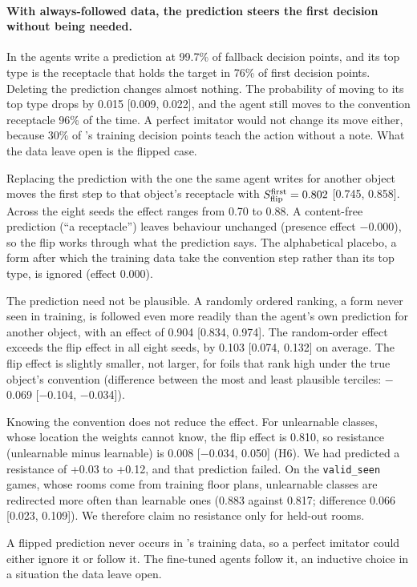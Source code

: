 \paragraph{With always-followed data, the prediction steers the first decision without being needed.}
In  the agents write a prediction at 99.7\% of fallback decision points, and its top type is the receptacle that holds the target in 76\% of first decision points. Deleting the prediction changes almost nothing. The probability of moving to its top type drops by 0.015 [0.009, 0.022], and the agent still moves to the convention receptacle 96\% of the time. A perfect imitator would not change its move either, because 30\% of 's training decision points teach the action without a note. What the data leave open is the flipped case.

Replacing the prediction with the one the same agent writes for another object moves the first step to that object's receptacle with $S_{\mathrm{flip}}^{\mathrm{first}} = 0.802$ [0.745, 0.858]. Across the eight seeds the effect ranges from 0.70 to 0.88. A content-free prediction (``a receptacle'') leaves behaviour unchanged (presence effect $-$0.000), so the flip works through what the prediction says. The alphabetical placebo, a form after which the training data take the convention step rather than its top type, is ignored (effect 0.000).

The prediction need not be plausible. A randomly ordered ranking, a form never seen in training, is followed even more readily than the agent's own prediction for another object, with an effect of 0.904 [0.834, 0.974]. The random-order effect exceeds the flip effect in all eight seeds, by 0.103 [0.074, 0.132] on average. The flip effect is slightly smaller, not larger, for foils that rank high under the true object's convention (difference between the most and least plausible terciles: $-$0.069 [$-$0.104, $-$0.034]).

Knowing the convention does not reduce the effect. For unlearnable classes, whose location the weights cannot know, the flip effect is 0.810, so resistance (unlearnable minus learnable) is 0.008 [$-$0.034, 0.050] (H6). We had predicted a resistance of +0.03 to +0.12, and that prediction failed. On the \texttt{valid\_seen} games, whose rooms come from training floor plans, unlearnable classes are redirected more often than learnable ones (0.883 against 0.817; difference 0.066 [0.023, 0.109]). We therefore claim no resistance only for held-out rooms.

A flipped prediction never occurs in 's training data, so a perfect imitator could either ignore it or follow it. The fine-tuned agents follow it, an inductive choice in a situation the data leave open.

